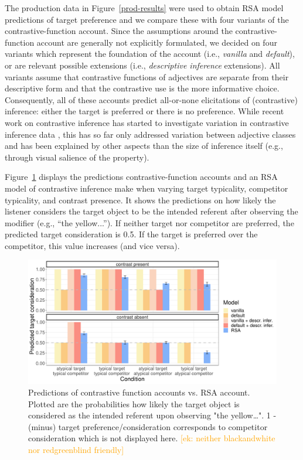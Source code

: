 \documentclass[a4paper,man,floatsintext,natbib]{apa6}
\newcommand{\ek}[1]{\textcolor{Orange}{[ek: #1]}}
\newcommand{\figref}[1]{Figure~\ref{#1}}
\begin{document}
The production data in \figref{prod-results} were used to obtain RSA model predictions of target preference and we compare these with four variants of the contrastive-function account. Since the assumptions around the contrastive-function account are generally not explicitly formulated, we decided on four variants which represent the foundation of the account (i.e., \emph{vanilla} and \emph{default}), or are relevant possible extensions (i.e., \emph{descriptive inference} extensions). All variants assume that contrastive functions of adjectives are separate from their descriptive form and that the contrastive use is the more informative choice. Consequently, all of these accounts predict all-or-none elicitations of (contrastive) inference: either the target is preferred or there is no preference. While recent work on contrastive inference has started to investigate variation in contrastive inference data \citep{Aparicio:2018,Rubio-Fernandez:2019}, this has so far only addressed variation between adjective classes and has been explained by other aspects than the size of inference itself (e.g., through visual salience of the property).

\figref{model-predictions} displays the predictions contrastive-function accounts and an RSA model of contrastive inference make when varying target typicality, competitor typicality, and contrast presence. It shows the predictions on how likely the listener considers the target object to be the intended referent after observing the modifier (e.g., ``the yellow...''). If neither target nor competitor are preferred, the predicted target consideration is 0.5. If the target is preferred over the competitor, this value increases (and vice versa).

\begin{figure}
	\begin{center}
		\includegraphics[width=1\textwidth]{img/model-comparison.pdf}
	\end{center}
\caption{Predictions of contrastive function accounts vs. RSA account. Plotted are the probabilities how likely the target object is considered as the intended referent upon observing "the yellow\dots". 1 -(minus) target preference/consideration corresponds to competitor consideration which is not displayed here. \ek{neither blackandwhite nor redgreenblind friendly}} 
\label{model-predictions}
\end{figure}
\end{document}

